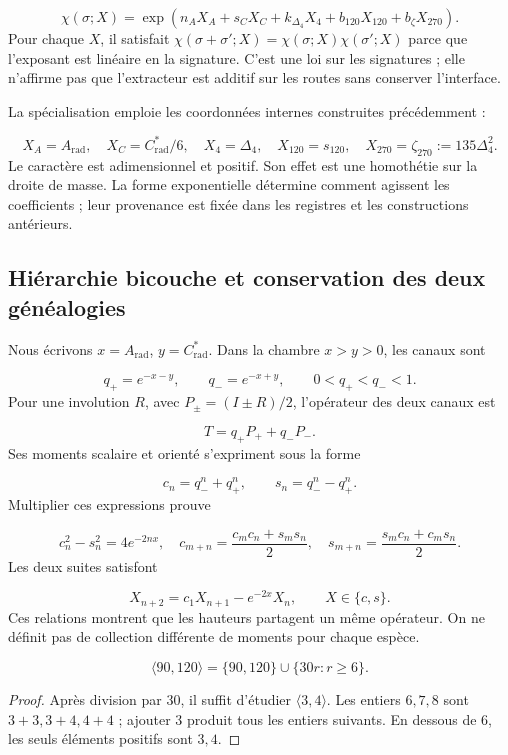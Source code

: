 \[
 \chi(\sigma;X)=\exp\!\left(n_AX_A+s_CX_C+k_{\Delta_4}X_4+
 b_{120}X_{120}+b_{\zeta}X_{270}\right).
\]
Pour chaque \(X\), il satisfait
\(\chi(\sigma+\sigma';X)=\chi(\sigma;X)\chi(\sigma';X)\)
parce que l’exposant est linéaire en la signature. C’est une loi sur les signatures ; elle
n’affirme pas que l’extracteur est additif sur les routes sans conserver l’interface.


La spécialisation emploie les coordonnées internes construites précédemment :

\[
 X_A=A_{\mathrm{rad}},\quad X_C=C^*_{\mathrm{rad}}/6,
 \quad X_4=\Delta_4,\quad X_{120}=s_{120},\quad
 X_{270}=\zeta_{270}:=135\Delta_4^2.
\]
Le caractère est adimensionnel et positif. Son effet est une homothétie sur
la droite de masse. La forme exponentielle détermine comment agissent les
coefficients ; leur provenance est fixée dans les registres et les constructions
antérieurs.


\subsection{Hiérarchie bicouche et conservation des deux généalogies
}

Nous écrivons \(x=A_{\mathrm{rad}}\), \(y=C^*_{\mathrm{rad}}\). Dans la
chambre \(x>y>0\), les canaux sont

\[
 q_+=e^{-x-y},\qquad q_-=e^{-x+y},\qquad0<q_+<q_-<1.
\]
Pour une involution \(R\), avec \(P_\pm=(I\pm R)/2\), l’opérateur
des deux canaux est

\[
 T=q_+P_++q_-P_-.
\]
Ses moments scalaire et orienté s’expriment sous la forme

\[
 c_n=q_-^n+q_+^n,\qquad s_n=q_-^n-q_+^n.
\]
Multiplier ces expressions prouve

\[
 c_n^2-s_n^2=4e^{-2nx},\quad
 c_{m+n}=\frac{c_mc_n+s_ms_n}{2},\quad
 s_{m+n}=\frac{s_mc_n+c_ms_n}{2}.
\]
Les deux suites satisfont

\[
 X_{n+2}=c_1X_{n+1}-e^{-2x}X_n,\qquad X\in\{c,s\}.
\]
Ces relations montrent que les hauteurs partagent un même opérateur.
On ne définit pas de collection différente de moments pour chaque espèce.


\begin{proposition}
\[
 \langle90,120\rangle=\{90,120\}\cup\{30r:r\ge6\}.
\]
\end{proposition}
\begin{proof}
Après division par \(30\), il suffit d’étudier \(\langle3,4\rangle\).
Les entiers \(6,7,8\) sont \(3+3,3+4,4+4\) ; ajouter \(3\) produit
tous les entiers suivants. En dessous de \(6\), les seuls
éléments positifs sont \(3,4\).

\end{proof}

